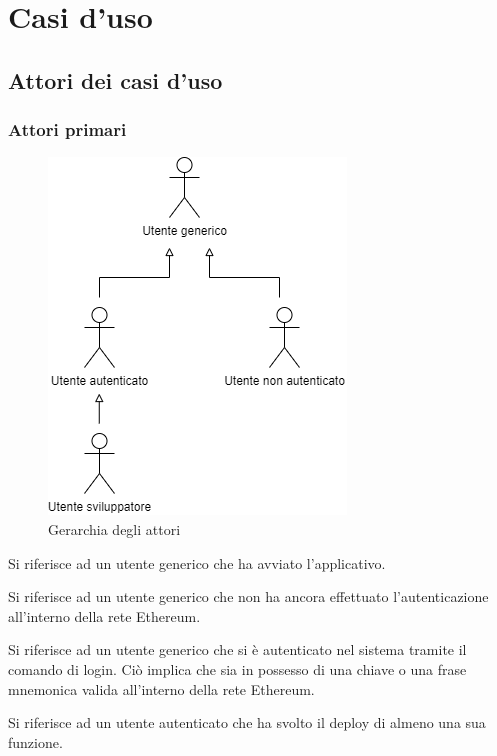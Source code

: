 \section{Casi d'uso}
\subsection{Attori dei casi d'uso}
	
	\subsubsection{Attori primari}
		\begin{figure}[h]
			\centering
			\includegraphics[scale=0.5]{./res/img/gerarchia.png}
			\caption {Gerarchia degli attori}
		\end{figure}
		\begin{description}[style=nextline]
			\item[\textbf{Utente generico}]
				Si riferisce ad un utente generico che ha avviato l'applicativo. 
			\item[\textbf{Utente non autenticato}]
				Si riferisce ad un utente generico che non ha ancora effettuato l'autenticazione all'interno della rete Ethereum. 
			\item[\textbf{Utente autenticato}]
				Si riferisce ad un utente generico che si è autenticato nel sistema tramite il comando di login. Ciò implica che sia in possesso di una chiave o una frase mnemonica valida all'interno della rete Ethereum. 
			\item[\textbf{Utente sviuppatore}] 
				Si riferisce ad un utente autenticato che ha svolto il deploy di almeno una sua funzione. 
		\end{description}
	

